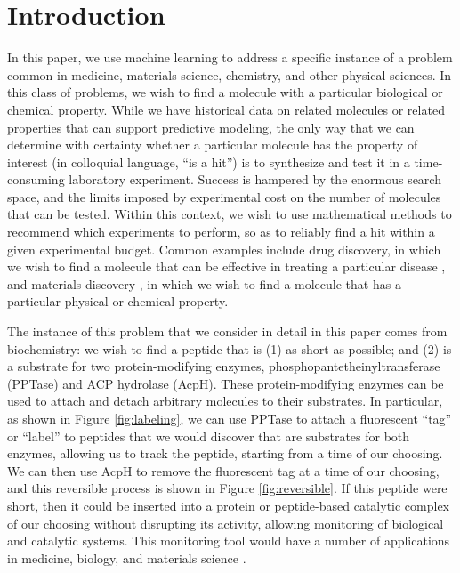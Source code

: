 \documentclass[12pt]{article}
\begin{document}


\section{Introduction}

In this paper, we use machine learning to address a specific instance of a problem common in medicine, materials science, chemistry, and other physical sciences.  In this class of problems, we wish to find a molecule with a particular biological or chemical property. While we have historical data on related molecules or related properties that can support predictive modeling, the only way that we can determine with certainty whether a particular molecule has the property of interest (in colloquial language, ``is a hit'') is to synthesize and test it in a time-consuming laboratory experiment. Success is hampered by the enormous search space, and the limits imposed by experimental cost on the number of molecules that can be tested.  Within this context, we wish to use mathematical methods to recommend which experiments to perform, so as to reliably find a hit within a given experimental budget. Common examples include drug discovery, in which we wish to find a molecule that can be effective in treating a particular disease \citep{Negoescu2010}, and materials discovery \citep{material1, material2}, in which we wish to find a molecule that has a particular physical or chemical property.

The instance of this problem that we consider in detail in this paper comes from biochemistry: we wish to find a peptide that is (1) as short as possible; and (2) is a substrate for two protein-modifying enzymes, phosphopantetheinyltransferase (PPTase) and ACP hydrolase (AcpH). These protein-modifying enzymes can be used to attach and detach arbitrary molecules to their substrates.  In particular, 
 as shown in Figure \ref{fig:labeling}, 
we can use PPTase to attach a fluorescent ``tag'' or ``label'' to peptides that we would discover that are substrates for both enzymes, allowing us to track the peptide, starting from a time of our choosing.  We can then use AcpH to remove the fluorescent tag at a time of our choosing, and this reversible process is shown in Figure \ref{fig:reversible}.  If this peptide were short, then it could be inserted into a protein or peptide-based catalytic complex of our choosing without disrupting its activity, allowing monitoring of biological and catalytic systems.  This monitoring tool would have a number of applications in medicine, biology, and materials science \citep{nick}.
\end{document}

